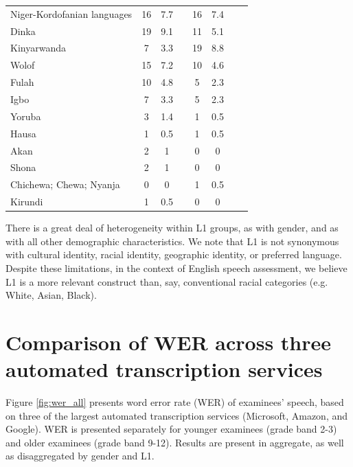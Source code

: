 \documentclass [PhD] {uclathes}
\begin{document}
\begin{table}[htbp]
\begin{tabular}{lccccccc}
\hspace{3mm} Niger-Kordofanian languages & 16 & 7.7 & & 16 & 7.4 \\
\hspace{3mm} Dinka & 19 & 9.1 & & 11 & 5.1 \\
\hspace{3mm} Kinyarwanda & 7 & 3.3 & & 19 & 8.8 \\
\hspace{3mm} Wolof & 15 & 7.2 & & 10 & 4.6 \\
\hspace{3mm} Fulah & 10 & 4.8 & & 5 & 2.3 \\
\hspace{3mm} Igbo & 7 & 3.3 & & 5 & 2.3 \\
\hspace{3mm} Yoruba & 3 & 1.4 & & 1 & 0.5 \\
\hspace{3mm} Hausa & 1 & 0.5 & & 1 & 0.5 \\
\hspace{3mm} Akan & 2 & 1 & & 0 & 0 \\
\hspace{3mm} Shona & 2 & 1 & & 0 & 0 \\
\hspace{3mm} Chichewa; Chewa; Nyanja & 0 & 0 & & 1 & 0.5 \\
\hspace{3mm} Kirundi & 1 & 0.5 & & 0 & 0 \\
    \bottomrule
    \end{tabular}
\end{table}

There is a great deal of heterogeneity within L1 groups, as with gender, and as with all other demographic characteristics. We note that L1 is not synonymous with cultural identity, racial identity, geographic identity, or preferred language. Despite these limitations, in the context of English speech assessment, we believe L1 is a more relevant construct than, say, conventional racial categories (e.g. White, Asian, Black). 

\section{Comparison of WER across three automated transcription services}
\label{sec:appendix_wer}

Figure \ref{fig:wer_all} presents word error rate (WER) of examinees' speech, based on three of the largest automated transcription services (Microsoft, Amazon, and Google). WER is presented separately for younger examinees (grade band 2-3) and older examinees (grade band 9-12). Results are present in aggregate, as well as disaggregated by gender and L1. 
\end{document}
